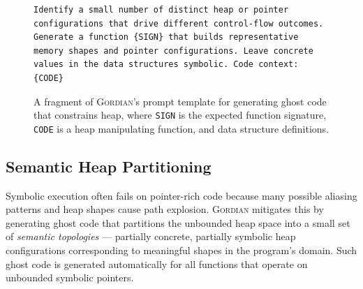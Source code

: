 \documentclass[acmsmall,screen,nonacm]{acmart}
\newcommand{\projName}{\textsc{Gordian}\xspace}
\theoremstyle{definition}
\begin{document}
\begin{figure}[t]
    \centering
        {\scriptsize
      \begin{tcolorbox}[mybox,title={Ghost Topology Builder Prompt Template}]
        \begin{verbatim}
Identify a small number of distinct heap or pointer configurations that drive different control-flow outcomes.
Generate a function {SIGN} that builds representative memory shapes and pointer configurations. Leave concrete
values in the data structures symbolic. Code context: {CODE}
      \end{verbatim}
      \end{tcolorbox}
        }
\vspace{-3mm}
\caption{\label{fig:topology_template}A fragment of \projName's prompt template for generating ghost code that constrains heap, where \texttt{SIGN} is the expected function signature, \texttt{CODE} is a heap manipulating function, and data structure definitions.}
\vspace{-3mm}
\end{figure}

\subsection{Semantic Heap Partitioning}

Symbolic execution often fails on pointer-rich code because many possible aliasing patterns and heap shapes cause path explosion. \projName mitigates this by generating ghost code that partitions the unbounded heap space into a small set of \emph{semantic topologies} --- partially concrete, partially symbolic heap configurations corresponding to meaningful shapes in the program's domain. Such ghost code is generated automatically for all functions that operate on unbounded symbolic pointers.
\end{document}
